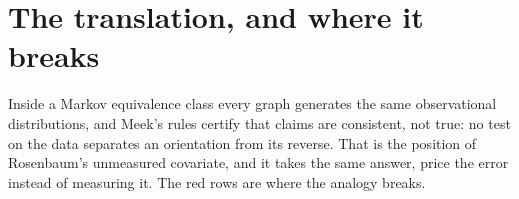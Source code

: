 \begin{antes}
\end{antes}

\section{The translation, and where it breaks}

Inside a Markov equivalence class every graph generates the same observational distributions, and
Meek's rules certify that claims are consistent, not true: no test on the data separates an
orientation from its reverse. That is the position of Rosenbaum's unmeasured covariate, and it takes
the same answer, price the error instead of measuring it. The red rows are where the analogy breaks.

